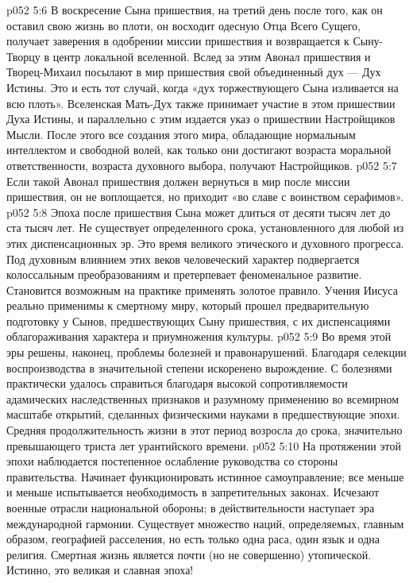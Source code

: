 \vs p052 5:6 \pc В воскресение Сына пришествия, на третий день после того, как он оставил свою жизнь во плоти, он восходит одесную Отца Всего Сущего, получает заверения в одобрении миссии пришествия и возвращается к Сыну\hyp{}Творцу в центр локальной вселенной. Вслед за этим Авонал пришествия и Творец\hyp{}Михаил посылают в мир пришествия свой объединенный дух --- Дух Истины. Это и есть тот случай, когда «дух торжествующего Сына изливается на всю плоть». Вселенская Мать\hyp{}Дух также принимает участие в этом пришествии Духа Истины, и параллельно с этим издается указ о пришествии Настройщиков Мысли. После этого все создания этого мира, обладающие нормальным интеллектом и свободной волей, как только они достигают возраста моральной ответственности, возраста духовного выбора, получают Настройщиков.
\vs p052 5:7 Если такой Авонал пришествия должен вернуться в мир после миссии пришествия, он не воплощается, но приходит «во славе с воинством серафимов».
\vs p052 5:8 \pc Эпоха после пришествия Сына может длиться от десяти тысяч лет до ста тысяч лет. Не существует определенного срока, установленного для любой из этих диспенсационных эр. Это время великого этического и духовного прогресса. Под духовным влиянием этих веков человеческий характер подвергается колоссальным преобразованиям и претерпевает феноменальное развитие. Становится возможным на практике применять золотое правило. Учения Иисуса реально применимы к смертному миру, который прошел предварительную подготовку у Сынов, предшествующих Сыну пришествия, с их диспенсациями облагораживания характера и приумножения культуры.
\vs p052 5:9 Во время этой эры решены, наконец, проблемы болезней и правонарушений. Благодаря селекции воспроизводства в значительной степени искоренено вырождение. С болезнями практически удалось справиться благодаря высокой сопротивляемости адамических наследственных признаков и разумному применению во всемирном масштабе открытий, сделанных физическими науками в предшествующие эпохи. Средняя продолжительность жизни в этот период возросла до срока, значительно превышающего триста лет урантийского времени.
\vs p052 5:10 На протяжении этой эпохи наблюдается постепенное ослабление руководства со стороны правительства. Начинает функционировать истинное самоуправление; все меньше и меньше испытывается необходимость в запретительных законах. Исчезают военные отрасли национальной обороны; в действительности наступает эра международной гармонии. Существует множество наций, определяемых, главным образом, географией расселения, но есть только одна раса, один язык и одна религия. Смертная жизнь является почти (но не совершенно) утопической. Истинно, это великая и славная эпоха!
